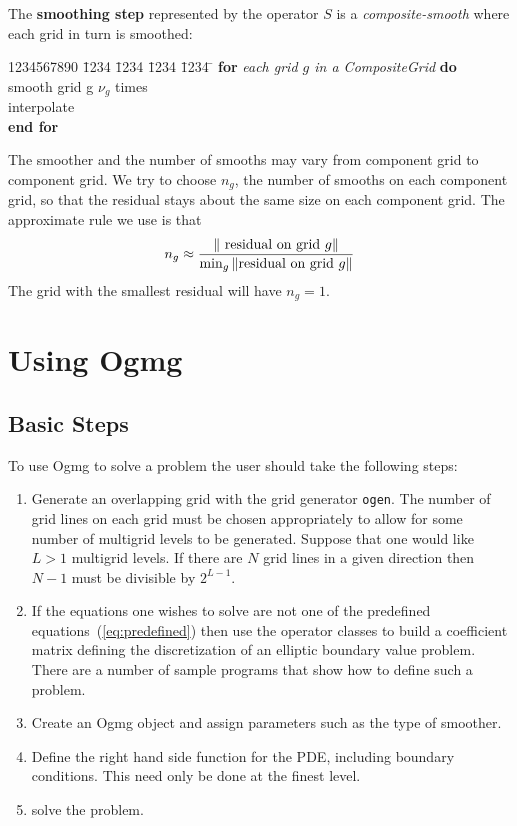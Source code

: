 \documentclass{article}
\begin{document}
The {\bf smoothing step} represented by the operator $S$ 
is a {\sl composite-smooth} where each grid in turn
is smoothed:
\begin{tabbing}
1234567890 \= 1234 \= 1234 \= 1234 \= 1234 \=  \kill  %
\> {\bf for } {\it each grid $g$ in a CompositeGrid} {\bf do}                   \\
\>\>  smooth grid g $\nu_g$ times       \\
\>\>  interpolate \\
\> {\bf end for}
\end{tabbing}
The smoother and the number of smooths may vary from component grid to
component grid. We try
to choose $n_g$, the number of smooths on each component grid, so that the
residual stays about the same size on each component grid. The approximate rule
we use is that
\[
    n_g \approx { \| \text{ residual on grid $g$} \| \over \min_g \| \text{residual on grid $g$} \| }
\]
The grid with the smallest residual will have $n_g=1$. 


\section{Using Ogmg}

\subsection{Basic Steps}

  To use Ogmg to solve a problem the user should take the following steps:
\begin{enumerate}
  \item Generate an overlapping grid with the grid generator {\tt ogen}. The number of grid lines on
   each grid must be chosen appropriately to allow for some number of multigrid levels to be
   generated. Suppose that one would like $L>1$ multigrid levels. 
   If there are $N$ grid lines in a given direction then $N-1$ must be divisible by $2^{L-1}$.
  \item If the equations one wishes to solve are not one of the predefined equations~(\ref{eq:predefined})
     then use the operator classes to build a coefficient matrix defining the 
     discretization of an elliptic boundary value problem. There are a number of sample programs
     that show how to define such a problem.
  \item Create an Ogmg object and assign parameters such as the type of smoother.
  \item Define the right hand side function for the PDE, including boundary conditions.
      This need only be done at the finest level.
  \item solve the problem.
\end{enumerate}
\end{document}
